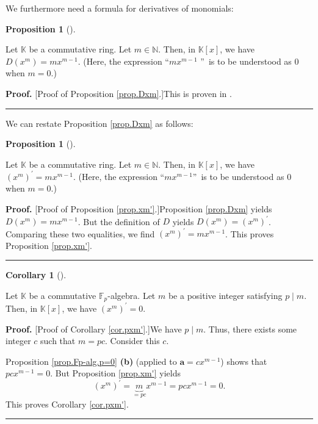 \documentclass[numbers=enddot,12pt,final,onecolumn,notitlepage]{scrartcl}%
\theoremstyle{definition}
\newtheorem{prop}[theo]{Proposition}
\newenvironment{proposition}[1][]
{\begin{prop}[#1]\begin{leftbar}}
{\end{leftbar}\end{prop}}
\newtheorem{coro}[theo]{Corollary}
\newenvironment{corollary}[1][]
{\begin{coro}[#1]\begin{leftbar}}
{\end{leftbar}\end{coro}}
\newenvironment{proof}[1][Proof]{\noindent\textbf{#1.} }{\ \rule{0.5em}{0.5em}}
\begin{document}
We furthermore need a formula for derivatives of monomials:

\begin{proposition}
\label{prop.Dxm}Let $\mathbb{K}$ be a commutative ring. Let $m\in\mathbb{N}$.
Then, in $\mathbb{K}\left[  x\right]  $, we have $D\left(  x^{m}\right)
=mx^{m-1}$. (Here, the expression \textquotedblleft$mx^{m-1}$%
\textquotedblright\ is to be understood as $0$ when $m=0$.)
\end{proposition}

\begin{proof}
[Proof of Proposition \ref{prop.Dxm}.]This is proven in \cite[Statement 8 in
the solution to Exercise 5]{19s-mt3s}.
\end{proof}

We can restate Proposition \ref{prop.Dxm} as follows:

\begin{proposition}
\label{prop.xm'}Let $\mathbb{K}$ be a commutative ring. Let $m\in\mathbb{N}$.
Then, in $\mathbb{K}\left[  x\right]  $, we have $\left(  x^{m}\right)
^{\prime}=mx^{m-1}$. (Here, the expression \textquotedblleft$mx^{m-1}%
$\textquotedblright\ is to be understood as $0$ when $m=0$.)
\end{proposition}

\begin{proof}
[Proof of Proposition \ref{prop.xm'}.]Proposition \ref{prop.Dxm} yields
$D\left(  x^{m}\right)  =mx^{m-1}$. But the definition of $D$ yields $D\left(
x^{m}\right)  =\left(  x^{m}\right)  ^{\prime}$. Comparing these two
equalities, we find $\left(  x^{m}\right)  ^{\prime}=mx^{m-1}$. This proves
Proposition \ref{prop.xm'}.
\end{proof}

\begin{corollary}
\label{cor.pxm'}Let $\mathbb{K}$ be a commutative $\mathbb{F}_{p}$-algebra.
Let $m$ be a positive integer satisfying $p\mid m$. Then, in $\mathbb{K}%
\left[  x\right]  $, we have $\left(  x^{m}\right)  ^{\prime}=0$.
\end{corollary}

\begin{proof}
[Proof of Corollary \ref{cor.pxm'}.]We have $p\mid m$. Thus, there exists some
integer $c$ such that $m=pc$. Consider this $c$.

Proposition \ref{prop.Fp-alg.p=0} \textbf{(b)} (applied to $\mathbf{a}%
=cx^{m-1}$) shows that $pcx^{m-1}=0$. But Proposition \ref{prop.xm'} yields%
\[
\left(  x^{m}\right)  ^{\prime}=\underbrace{m}_{=pc}x^{m-1}=pcx^{m-1}=0.
\]
This proves Corollary \ref{cor.pxm'}.
\end{proof}
\end{document}
